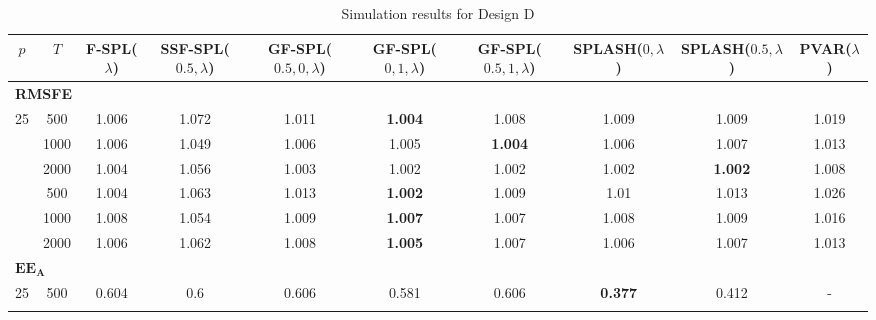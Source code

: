 \begin{landscape}
    \bgroup
    \def\arraystretch{1.3}
    \begin{table}[p]
    \footnotesize
    \centering
    \caption{Simulation results for Design D}
    \label{tab:results_designD}
    \begin{tabular}{cccccccccc}    
    \hline \hline
    $p$  &  $T$   &  F-SPL($\lambda$)  & SSF-SPL($0.5, \lambda$)  &  GF-SPL($0.5, 0, \lambda$)  &  GF-SPL($0, 1, \lambda$)  &  GF-SPL($0.5, 1, \lambda$)  &  SPLASH($0, \lambda$)  &  SPLASH($0.5, \lambda$)  &  PVAR($\lambda$)  \\
    \hline
    \multicolumn{10}{l}{\textbf{RMSFE}} \\
	\hline
	 25  & 500  &       1.006        &           1.072           &            1.011            & \textbf{1.004}            & 1.008                       &         1.009          & 1.009                    &       1.019       \\ \hdashline
	 25  & 1000 &       1.006        &           1.049           &            1.006            & 1.005                     & \textbf{1.004}              &         1.006          & 1.007                    &       1.013       \\ \hdashline
	 25  & 2000 &       1.004        &           1.056           &            1.003            & 1.002                     & 1.002                       &         1.002          & \textbf{1.002}           &       1.008       \\ \hdashline
	 36  & 500  &       1.004        &           1.063           &            1.013            & \textbf{1.002}            & 1.009                       &          1.01          & 1.013                    &       1.026       \\ \hdashline
	 36  & 1000 &       1.008        &           1.054           &            1.009            & \textbf{1.007}            & 1.007                       &         1.008          & 1.009                    &       1.016       \\ \hdashline
	 36  & 2000 &       1.006        &           1.062           &            1.008            & \textbf{1.005}            & 1.007                       &         1.006          & 1.007                    &       1.013       \\
	\hline
	\multicolumn{10}{l}{$\mathbf{EE_A}$} \\
	\hline
	 25  & 500  &       0.604        &            0.6            &            0.606            &           0.581           &            0.606            & \textbf{0.377}         &          0.412           & -                 \\ \hdashline

\end{tabular}
\end{table}
\end{landscape}
